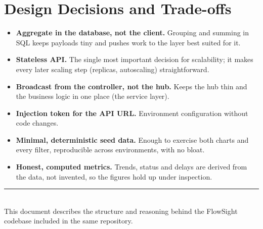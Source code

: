 \documentclass[11pt,a4paper]{article}
\begin{document}
\section{Design Decisions and Trade-offs}
\begin{itemize}[noitemsep]
  \item \textbf{Aggregate in the database, not the client.} Grouping and summing
        in SQL keeps payloads tiny and pushes work to the layer best suited for
        it.
  \item \textbf{Stateless API.} The single most important decision for
        scalability; it makes every later scaling step (replicas, autoscaling)
        straightforward.
  \item \textbf{Broadcast from the controller, not the hub.} Keeps the hub thin
        and the business logic in one place (the service layer).
  \item \textbf{Injection token for the API URL.} Environment configuration
        without code changes.
  \item \textbf{Minimal, deterministic seed data.} Enough to exercise both
        charts and every filter, reproducible across environments, with no
        bloat.
  \item \textbf{Honest, computed metrics.} Trends, status and delays are derived
        from the data, not invented, so the figures hold up under inspection.
\end{itemize}

\vspace{4mm}
\noindent\rule{\linewidth}{0.4pt}\\[1mm]
\small This document describes the structure and reasoning behind the FlowSight
codebase included in the same repository.
\end{document}
